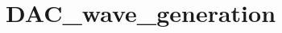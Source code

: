\hypertarget{group___d_a_c__wave__generation}{\section{D\-A\-C\-\_\-wave\-\_\-generation}
\label{group___d_a_c__wave__generation}
}
